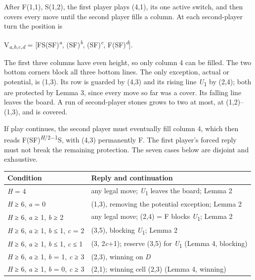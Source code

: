 \documentclass[
  a4paper,
]{article}
\newcounter{none} %
\begin{document}
After F(1,1), S(1,2), the first player plays (4,1), its one active
switch, and then covers every move until the second player fills a
column. At each second-player turn the position is

V\textsubscript{\emph{a},\emph{b},\emph{c},\emph{d}} =
{[}FS(SF)\textsuperscript{\emph{a}}, (SF)\textsuperscript{\emph{b}},
(SF)\textsuperscript{\emph{c}}, F(SF)\textsuperscript{\emph{d}}{]}.

The first three columns have even height, so only column 4 can be
filled. The two bottom corners block all three bottom lines. The only
exception, actual or potential, is (1,3). Its row is guarded by (4,3)
and its rising line \emph{U}\textsubscript{1} by (2,4); both are
protected by Lemma 3, since every move so far was a cover. Its falling
line leaves the board. A run of second-player stones grows to two at
most, at (1,2)--(1,3), and is covered.

If play continues, the second player must eventually fill column 4,
which then reads F(SF)\textsuperscript{\emph{H}/2−1}S, with (4,3)
permanently F. The first player's forced reply must not break the
remaining protection. The seven cases below are disjoint and exhaustive.

{\def\LTcaptype{none} %
\begin{longtable}[]{@{}
  >{\raggedright\arraybackslash}p{}
  >{\raggedright\arraybackslash}p{}@{}}
\toprule\noalign{}
\begin{minipage}[b]{\linewidth}\raggedright
Condition
\end{minipage} & \begin{minipage}[b]{\linewidth}\raggedright
Reply and continuation
\end{minipage} \\
\midrule\noalign{}
\endhead
\bottomrule\noalign{}
\endlastfoot
\emph{H} = 4 & any legal move; \emph{U}\textsubscript{1} leaves the
board; Lemma 2 \\
\emph{H} ≥ 6, \emph{a} = 0 & (1,3), removing the potential exception;
Lemma 2 \\
\emph{H} ≥ 6, \emph{a} ≥ 1, \emph{b} ≥ 2 & any legal move; (2,4) = F
blocks \emph{U}\textsubscript{1}; Lemma 2 \\
\emph{H} ≥ 6, \emph{a} ≥ 1, \emph{b} ≤ 1, \emph{c} = 2 & (3,5), blocking
\emph{U}\textsubscript{1}; Lemma 2 \\
\emph{H} ≥ 6, \emph{a} ≥ 1, \emph{b} ≤ 1, \emph{c} ≤ 1 & (3,
2\emph{c}+1); reserve (3,5) for \emph{U}\textsubscript{1} (Lemma 4,
blocking) \\
\emph{H} ≥ 6, \emph{a} ≥ 1, \emph{b} = 1, \emph{c} ≥ 3 & (2,3), winning
on \emph{D} \\
\emph{H} ≥ 6, \emph{a} ≥ 1, \emph{b} = 0, \emph{c} ≥ 3 & (2,1); winning
cell (2,3) (Lemma 4, winning) \\
\end{longtable}
}
\end{document}
